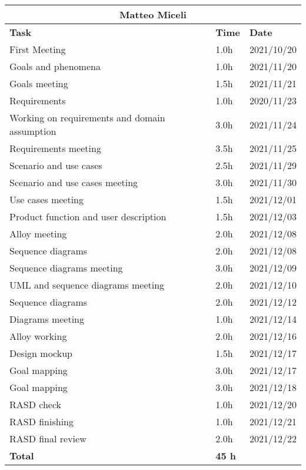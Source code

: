 \begin{table}[!ht]
\centering
\begin{tabular}{|p{}|p{}|p{}|}
\hline
\multicolumn{3}{|c|}{\textbf{Matteo Miceli}}            \\ \hline
\textbf{Task}                   & \textbf{Time} & \textbf{Date} \\ \hline

First Meeting				&		1.0h	   &	2021/10/20 \\ \hline
Goals and phenomena			&		1.0h	   & 	2021/11/20 \\ \hline
Goals meeting					&		1.5h	   &	2021/11/21 \\ \hline
Requirements		&		1.0h	   &	2020/11/23 \\ \hline
Working on requirements and domain assumption			&		3.0h	   &	2021/11/24 \\ \hline
Requirements  meeting		&		3.5h	   &	2021/11/25 \\ \hline
Scenario and use cases		&		2.5h    &   	2021/11/29 \\ \hline
Scenario and use cases meeting		&		3.0h	   & 	2021/11/30 \\ \hline
Use cases meeting		&		1.5h	   & 	2021/12/01 \\ \hline
Product function and user description		&		1.5h	   & 	2021/12/03 \\ \hline
Alloy meeting				&		2.0h     &	2021/12/08 \\ \hline
Sequence diagrams			&	 2.0h	  &	2021/12/08 \\ \hline
Sequence diagrams meeting				&		3.0h	   & 	2021/12/09 \\ \hline
UML and sequence diagrams meeting				&		2.0h	   & 	2021/12/10 \\ \hline
Sequence diagrams			&		2.0h	  &	2021/12/12 \\ \hline
Diagrams meeting				&		1.0h	   & 	2021/12/14 \\ \hline
Alloy working				&		2.0h	  &    2021/12/16 \\ \hline 
Design mockup			&		1.5h	  &    2021/12/17 \\ \hline 
Goal mapping	&		3.0h	  &    2021/12/17  \\ \hline
Goal mapping	&		3.0h	  &    2021/12/18  \\ \hline
RASD check				&		1.0h   &	2021/12/20 \\ \hline
RASD finishing				&		1.0h	  &    2021/12/21  \\ \hline
RASD final review			&		2.0h	  &    2021/12/22  \\ \hline
\textbf{Total}                  		&  \textbf{45 h}   & \\ \hline
\end{tabular}
\end{table}


